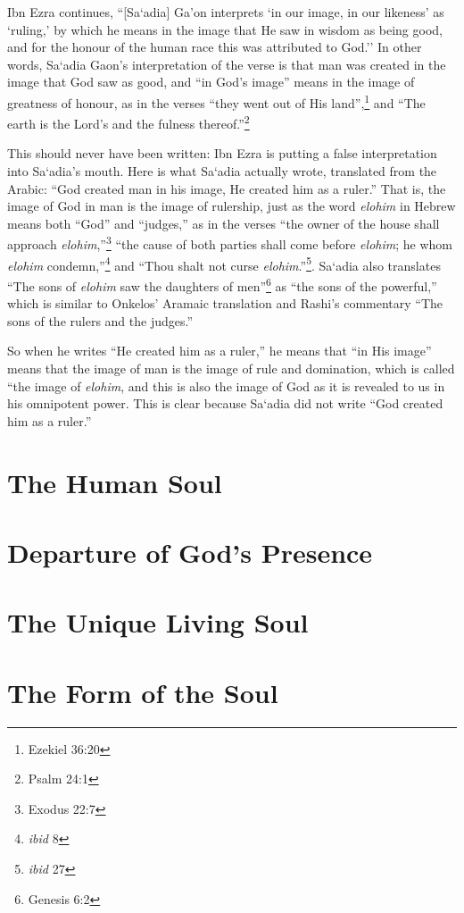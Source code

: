 \documentclass[11pt, a5paper, twoside, chapterprefix, openany]{scrbook}
\begin{document}
Ibn Ezra continues, ``[Sa`adia] Ga'on interprets `in our image, in our likeness' as `ruling,' by which he means in the image that He saw in wisdom as being good, and for the honour of the human race this was attributed to God.'' In other words, Sa`adia Gaon's interpretation of the verse is that man was created in the image that God saw as good, and ``in God's image'' means in the image of greatness of honour, as in the verses ``they went out of His land'',\footnote{Ezekiel 36:20} and ``The earth is the Lord's and the fulness thereof.''\footnote{Psalm 24:1}

This should never have been written: Ibn Ezra is putting a false interpretation into Sa`adia's mouth. Here is what Sa`adia actually wrote, translated from the Arabic: ``God created man in his image, He created him as a ruler.'' That is, the image of God in man is the image of rulership, just as the word \textit{elohim} in Hebrew means both ``God'' and ``judges,'' as in the verses ``the owner of the house shall approach \textit{elohim},''\footnote{Exodus 22:7} ``the cause of both parties shall come before \textit{elohim}; he whom \textit{elohim} condemn,''\footnote{\textit{ibid} 8} and ``Thou shalt not  curse \textit{elohim}.''\footnote{\textit{ibid} 27}. Sa`adia also translates ``The sons of \textit{elohim} saw the daughters of men''\footnote{Genesis 6:2} as ``the sons of the powerful,'' which is similar to Onkelos' Aramaic translation and Rashi's commentary ``The sons of the rulers and the judges.''

So when he writes ``He created him as a ruler,'' he means that ``in His image'' means that the image of man is the image of rule and domination, which is called ``the image of \textit{elohim}, and this is also the image of God as it is revealed to us in his omnipotent power. This is clear because Sa`adia did not write ``God created him as a ruler.''

\chapter{The Human Soul}
\chapter{Departure of God’s Presence}
\chapter{The Unique Living Soul}
\chapter{The Form of the Soul}
\end{document}
